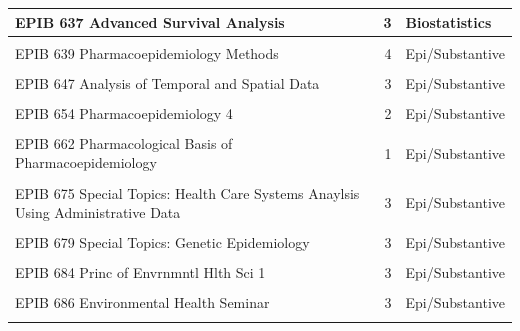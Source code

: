 \documentclass[
  letterpaper,
  DIV=11,
  numbers=noendperiod]{scrreprt}
\begin{document}
\begin{table}
{{\begin{tabular}[t]{l|r|l}
\hline
EPIB 637 Advanced Survival Analysis & 3 & Biostatistics\\
\hline
\cellcolor{gray!10}{EPIB 638 Mathematical Modeling of Infectious Diseases} & \cellcolor{gray!10}{3} & \cellcolor{gray!10}{Epi/Substantive}\\
\hline
EPIB 639 Pharmacoepidemiology Methods & 4 & Epi/Substantive\\
\hline
\cellcolor{gray!10}{EPIB 645 Confounding Control in Pharmacoepidemiology} & \cellcolor{gray!10}{1} & \cellcolor{gray!10}{Epi/Substantive}\\
\hline
EPIB 647 Analysis of Temporal and Spatial Data & 3 & Epi/Substantive\\
\hline
\cellcolor{gray!10}{EPIB 648 Methods in Social Epidemiology} & \cellcolor{gray!10}{3} & \cellcolor{gray!10}{Epi/Substantive}\\
\hline
EPIB 654 Pharmacoepidemiology 4 & 2 & Epi/Substantive\\
\hline
\cellcolor{gray!10}{EPIB 661 Pharmacoepidemiology 3} & \cellcolor{gray!10}{2} & \cellcolor{gray!10}{Epi/Substantive}\\
\hline
EPIB 662 Pharmacological Basis of Pharmacoepidemiology & 1 & Epi/Substantive\\
\hline
\cellcolor{gray!10}{EPIB 671 Cancer Epidemiology\&Prevention} & \cellcolor{gray!10}{2} & \cellcolor{gray!10}{Epi/Substantive}\\
\hline
EPIB 675 Special Topics: Health Care Systems Anaylsis Using Administrative Data & 3 & Epi/Substantive\\
\hline
\cellcolor{gray!10}{EPIB 676 Special Topics: Bayesian Analysis in the Health Sciences} & \cellcolor{gray!10}{3} & \cellcolor{gray!10}{Biostatistics}\\
\hline
EPIB 679 Special Topics: Genetic Epidemiology & 3 & Epi/Substantive\\
\hline
\cellcolor{gray!10}{EPIB 681 Global Health: Epid. Research} & \cellcolor{gray!10}{3} & \cellcolor{gray!10}{Epi/Substantive}\\
\hline
EPIB 684 Princ of Envrnmntl Hlth Sci 1 & 3 & Epi/Substantive\\
\hline
\cellcolor{gray!10}{EPIB 685 Princ of Envrnmntl Hlth Sci 2} & \cellcolor{gray!10}{3} & \cellcolor{gray!10}{Epi/Substantive}\\
\hline
EPIB 686 Environmental Health Seminar & 3 & Epi/Substantive\\
\hline
\cellcolor{gray!10}{EPIB 710 Advanced Causal Inference} & \cellcolor{gray!10}{3} & \cellcolor{gray!10}{Biostatistics}\\

\end{tabular}}}
\end{table}
\end{document}
